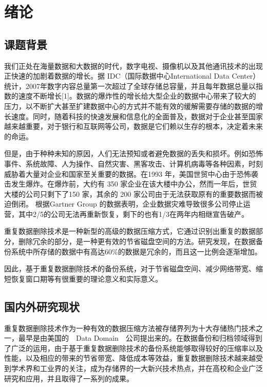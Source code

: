 \chapter{绪论}\thispagestyle{main}

\section{课题背景}

\par 我们正处在海量数据和大数据的时代，数字电视、摄像机以及其他通讯技术的出现正快速的加剧着数据的增长。据 IDC（国际数据中心International Data Center）统计，2007年数字内容总量第一次超过了全球存储总容量，并且每年数据总量以指数的速度不断增长[1]。数据的爆炸性的增长给大型企业的数据中心带来了较大的压力，以不断扩大甚至扩建数据中心的方式并不能有效的缓解需要存储的数据的增长速度。同时，随着科技的快速发展和信息化的全面普及，数据对于企业甚至国家越来越重要，对于银行和互联网等公司，数据是它们赖以生存的根本，决定着未来的命运。

\par 但是，由于种种未知的原因，人们无法预知或者避免数据的丢失和损坏。例如恐怖事件、系统故障、人为操作、自然灾害、黑客攻击、计算机病毒等各种因素，时刻威胁着大量对企业和国家至关重要的数据。在1993 年，美国世贸中心由于恐怖袭击发生爆炸。在爆炸前，大约有 350 家企业在该大楼中办公，然而一年后，世贸大楼的公司只剩下了150 家，其余的 200 家公司由于无法获取原有的重要数据而被迫倒闭。 根据Gartner Group 的数据表明，企业数据灾难导致很多公司停止运营，其中2/5的公司无法再重新恢复，剩下的也有1/3在两年内相继宣告破产。

\par 重复数据删除技术是一种新型的高级的数据压缩方式，它通过识别出重复的数据部分，删除冗余的部分，是一种更有效的节省磁盘空间的方法。研究发现，在数据备份系统中所存储的数据中有高达60\%的数据是冗余的，而且这一比例会逐渐增加。

\par 因此，基于重复数据删除技术的备份系统，对于节省磁盘空间、减少网络带宽、缩短恢复窗口期等有很重要的理论意义和实际意义。

\section{国内外研究现状}

\par 重复数据删除技术作为一种有效的数据压缩方法被存储界列为十大存储热门技术之一，最早是由美国的\ \ Data Domain\ \ 公司提出来的。在数据备份和归档领域得到了广泛的运用，由于基于重复数据删除技术的备份系统能够取得较好的压缩率以及性能，以及相应的带来的节省带宽、降低成本等效益，重复数据删除技术越来越受到学术界和工业界的关注，成为存储界的一大新兴技术热点，并在高校和企业广泛研究和应用，并且取得了一系列的成果。
